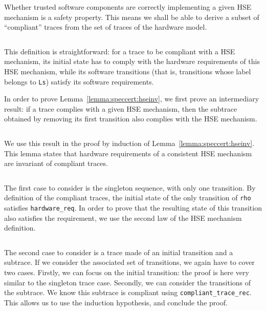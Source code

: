 Whether trusted software components are correctly implementing a given HSE
mechanism is a safety property.
%
This means we shall be able to derive a subset of ``compliant'' traces from the
set of traces of the hardware model.

\inputminted[gobble=2,firstline=147,lastline=156]{coq}{Listings/SpecCert.v}

This definition is straightforward: for a trace to be compliant with a HSE
mechanism, its initial state has to comply with the hardware requirements of
this HSE mechanism, while its software transitions (that is, transitions whose
label belongs to \texttt{Ls}) satisfy its software requirements.

In order to prove Lemma~\ref{lemma:speccert:hseinv}, we first prove an
intermediary result: if a trace complies with a given HSE mechanism, then the
subtrace obtained by removing its first transition also complies with the HSE
mechanism.

\inputminted[gobble=2,firstline=158,lastline=180]{coq}{Listings/SpecCert.v}

We use this result in the proof by induction of
Lemma~\ref{lemma:speccert:hseinv}.
%
This lemma states that hardware requirements of a consistent HSE mechanism are
invariant of compliant traces.

\inputminted[gobble=2,firstline=184,lastline=196]{coq}{Listings/SpecCert.v}

The first case to consider is the singleton sequence, with only one transition.
%
By definition of the compliant traces, the initial state of the only transition
of \texttt{rho} satisfies \texttt{hardware\_req}.
%
In order to prove that the resulting state of this transition also satisfies the
requirement, we use the second law of the HSE mechanism definition.

\inputminted[gobble=2,firstline=197,lastline=202]{coq}{Listings/SpecCert.v}

The second case to consider is a trace made of an initial transition and a
subtrace.
%
If we consider the associated set of transitions, we again have to cover two
cases.
%
Firstly, we can focus on the initial transition: the proof is here very similar to
the singleton trace case.
%
Secondly, we can consider the transitions of the subtrace.
%
We know this subtrace is compliant using \texttt{compliant\_trace\_rec}.
%
This allows us to use the induction hypothesis, and conclude the proof.

\inputminted[gobble=2,firstline=203,lastline=215]{coq}{Listings/SpecCert.v}

